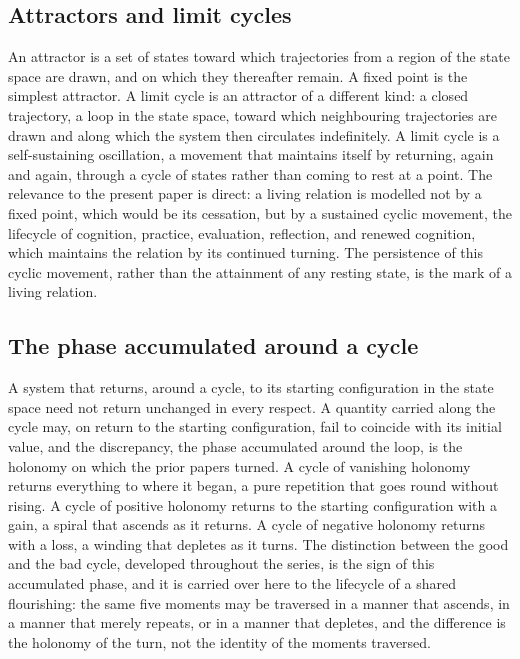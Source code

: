 \subsection{Attractors and limit cycles}
\label{p11:sec:dyn-attractors}

An attractor is a set of states toward which trajectories from a region of the state space are drawn, and on which they thereafter remain. A fixed point is the simplest attractor. A limit cycle is an attractor of a different kind: a closed trajectory, a loop in the state space, toward which neighbouring trajectories are drawn and along which the system then circulates indefinitely. A limit cycle is a self-sustaining oscillation, a movement that maintains itself by returning, again and again, through a cycle of states rather than coming to rest at a point. The relevance to the present paper is direct: a living relation is modelled not by a fixed point, which would be its cessation, but by a sustained cyclic movement, the lifecycle of cognition, practice, evaluation, reflection, and renewed cognition, which maintains the relation by its continued turning. The persistence of this cyclic movement, rather than the attainment of any resting state, is the mark of a living relation.

\subsection{The phase accumulated around a cycle}
\label{p11:sec:dyn-phase}

A system that returns, around a cycle, to its starting configuration in the state space need not return unchanged in every respect. A quantity carried along the cycle may, on return to the starting configuration, fail to coincide with its initial value, and the discrepancy, the phase accumulated around the loop, is the holonomy on which the prior papers turned. A cycle of vanishing holonomy returns everything to where it began, a pure repetition that goes round without rising. A cycle of positive holonomy returns to the starting configuration with a gain, a spiral that ascends as it returns. A cycle of negative holonomy returns with a loss, a winding that depletes as it turns. The distinction between the good and the bad cycle, developed throughout the series, is the sign of this accumulated phase, and it is carried over here to the lifecycle of a shared flourishing: the same five moments may be traversed in a manner that ascends, in a manner that merely repeats, or in a manner that depletes, and the difference is the holonomy of the turn, not the identity of the moments traversed.


